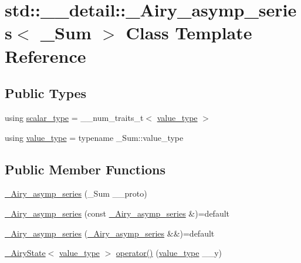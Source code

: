\hypertarget{classstd_1_1____detail_1_1__Airy__asymp__series}{}\section{std\+:\+:\+\_\+\+\_\+detail\+:\+:\+\_\+\+Airy\+\_\+asymp\+\_\+series$<$ \+\_\+\+Sum $>$ Class Template Reference}
\label{classstd_1_1____detail_1_1__Airy__asymp__series}
\subsection*{Public Types}
\begin{DoxyCompactItemize}
\item 
using \hyperlink{classstd_1_1____detail_1_1__Airy__asymp__series_ac2d0fa6d86d7a83c06dca057d0dfec3a}{scalar\+\_\+type} = \+\_\+\+\_\+num\+\_\+traits\+\_\+t$<$ \hyperlink{classstd_1_1____detail_1_1__Airy__asymp__series_a729a698f23629a2f94b6ef71f377efc5}{value\+\_\+type} $>$
\item 
using \hyperlink{classstd_1_1____detail_1_1__Airy__asymp__series_a729a698f23629a2f94b6ef71f377efc5}{value\+\_\+type} = typename \+\_\+\+Sum\+::value\+\_\+type
\end{DoxyCompactItemize}
\subsection*{Public Member Functions}
\begin{DoxyCompactItemize}
\item 
\hyperlink{classstd_1_1____detail_1_1__Airy__asymp__series_a2768b3e101876b969b606cbde8b2e133}{\+\_\+\+Airy\+\_\+asymp\+\_\+series} (\+\_\+\+Sum \+\_\+\+\_\+proto)
\item 
\hyperlink{classstd_1_1____detail_1_1__Airy__asymp__series_a48eab98c05f50ad5b5f00f1ad9628e14}{\+\_\+\+Airy\+\_\+asymp\+\_\+series} (const \hyperlink{classstd_1_1____detail_1_1__Airy__asymp__series}{\+\_\+\+Airy\+\_\+asymp\+\_\+series} \&)=default
\item 
\hyperlink{classstd_1_1____detail_1_1__Airy__asymp__series_a967f89ea4dfc21c982fdc61315ea720d}{\+\_\+\+Airy\+\_\+asymp\+\_\+series} (\hyperlink{classstd_1_1____detail_1_1__Airy__asymp__series}{\+\_\+\+Airy\+\_\+asymp\+\_\+series} \&\&)=default
\item 
\hyperlink{structstd_1_1____detail_1_1__AiryState}{\+\_\+\+Airy\+State}$<$ \hyperlink{classstd_1_1____detail_1_1__Airy__asymp__series_a729a698f23629a2f94b6ef71f377efc5}{value\+\_\+type} $>$ \hyperlink{classstd_1_1____detail_1_1__Airy__asymp__series_acd5ce4d332334a4f669a981d588b417c}{operator()} (\hyperlink{classstd_1_1____detail_1_1__Airy__asymp__series_a729a698f23629a2f94b6ef71f377efc5}{value\+\_\+type} \+\_\+\+\_\+y)
\end{DoxyCompactItemize}
